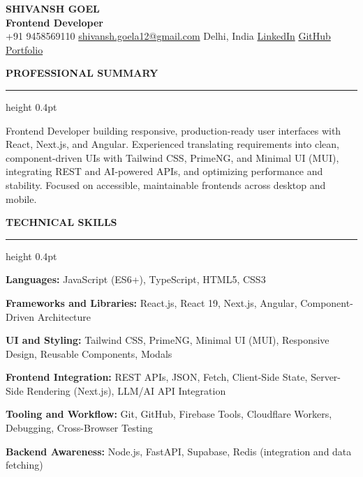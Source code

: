 \documentclass[10pt,a4paper]{article}
\newcommand{\resumeSection}[1]{%
  \vspace{5pt}
  {\normalsize\bfseries\color{heading} #1}\par
  \vspace{1pt}
  {\color{rulecolor}\hrule height 0.4pt}
  \vspace{3pt}
}
\newcommand{\skillLine}[2]{%
  \textbf{#1:} #2\par
}
\begin{document}
\begin{center}
    {\fontsize{21}{23}\selectfont\bfseries\color{heading}
    SHIVANSH GOEL}\\[2pt]
    {\normalsize\bfseries Frontend Developer}\\[4pt]

    {\small
    +91 9458569110
    \quad \textbar{} \quad
    \href{mailto:shivansh.goela12@gmail.com}
    {shivansh.goela12@gmail.com}
    \quad \textbar{} \quad
    Delhi, India
    \quad \textbar{} \quad
    \href{https://www.linkedin.com/in/shivansh-goel-5b2309174}
    {LinkedIn}
    \quad \textbar{} \quad
    \href{https://github.com/Tech-aficionado}
    {GitHub}
    \quad \textbar{} \quad
    \href{https://ash-labs.tech}
    {Portfolio}
    }
\end{center}

\vspace{-4pt}

\resumeSection{PROFESSIONAL SUMMARY}

Frontend Developer building responsive, production-ready user interfaces with
React, Next.js, and Angular. Experienced translating requirements into clean,
component-driven UIs with Tailwind CSS, PrimeNG, and Minimal UI (MUI),
integrating REST and AI-powered APIs, and optimizing performance and
stability. Focused on accessible, maintainable frontends across desktop and
mobile.

\resumeSection{TECHNICAL SKILLS}

\small

\skillLine{Languages}
{JavaScript (ES6+), TypeScript, HTML5, CSS3}

\skillLine{Frameworks and Libraries}
{React.js, React 19, Next.js, Angular, Component-Driven Architecture}

\skillLine{UI and Styling}
{Tailwind CSS, PrimeNG, Minimal UI (MUI), Responsive Design,
Reusable Components, Modals}

\skillLine{Frontend Integration}
{REST APIs, JSON, Fetch, Client-Side State, Server-Side Rendering (Next.js),
LLM/AI API Integration}

\skillLine{Tooling and Workflow}
{Git, GitHub, Firebase Tools, Cloudflare Workers, Debugging, Cross-Browser
Testing}

\skillLine{Backend Awareness}
{Node.js, FastAPI, Supabase, Redis (integration and data fetching)}
\end{document}
